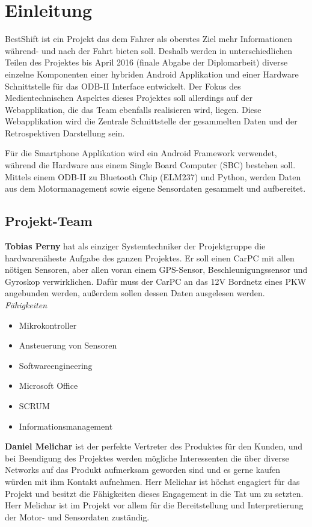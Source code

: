 \chapter{Einleitung}
BestShift ist ein Projekt das dem Fahrer als oberstes Ziel mehr Informationen während- und nach der Fahrt bieten soll. 
Deshalb werden in unterschiedlichen Teilen des Projektes bis April 2016 (finale Abgabe der Diplomarbeit) 
diverse einzelne Komponenten einer hybriden Android Applikation und einer Hardware Schnittstelle für das ODB-II 
Interface entwickelt. Der Fokus des Medientechnischen Aspektes dieses Projektes soll allerdings auf der Webapplikation,
die das Team ebenfalls realisieren wird, liegen. Diese Webapplikation wird die Zentrale Schnittstelle der gesammelten Daten
und der Retrospektiven Darstellung sein. 

Für die Smartphone Applikation wird ein Android Framework verwendet, 
während die Hardware aus einem Single Board Computer (SBC) bestehen soll. 
Mittels einem ODB-II zu Bluetooth Chip (ELM237) und Python, 
werden Daten aus dem Motormanagement sowie eigene Sensordaten gesammelt und aufbereitet. 

\newpage
\section{Projekt-Team}
\textbf{Tobias Perny} hat als einziger Systemtechniker der Projektgruppe die hardwarenäheste Aufgabe des ganzen Projektes. Er soll einen CarPC mit allen nötigen Sensoren, aber allen voran einem GPS-Sensor, Beschleunigungssensor und Gyroskop verwirklichen. Dafür muss der CarPC an das 12V Bordnetz eines PKW angebunden werden, außerdem sollen dessen Daten ausgelesen werden.
\nextline 
\textit{Fähigkeiten}
\begin{itemize}
	\item Mikrokontroller
	\item Ansteuerung von Sensoren		
	\item Softwareengineering
	\item Microsoft Office
	\item SCRUM
	\item Informationsmanagement
\end{itemize}

\nextline

\textbf{Daniel Melichar} ist der perfekte Vertreter des Produktes für den Kunden, und bei Beendigung des Projektes werden mögliche Interessenten die über diverse Networks auf das Produkt aufmerksam geworden sind und es gerne kaufen würden mit ihm Kontakt aufnehmen. Herr Melichar ist höchst engagiert für das Projekt und besitzt die Fähigkeiten dieses Engagement in die Tat um zu setzten. Herr Melichar ist im Projekt vor allem für die Bereitstellung und Interpretierung der Motor- und Sensordaten zuständig. 

